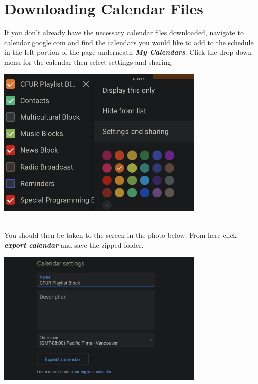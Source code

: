 \section*{Downloading Calendar Files}
If you don't already have the necessary calendar files downloaded, navigate to \url{calendar.google.com} and find the calendars you would like to add to the schedule in the left portion of the page underneath \textbf{\textit{My Calendars}}. Click the drop down menu for the calendar then select settings and sharing.
\\
\begin{center}
   \includegraphics[width=100mm]{images/calendars.png} 
\end{center}
\\
You should then be taken to the screen in the photo below. From here click \textbf{\textit{export calendar}} and save the zipped folder.

\begin{center}
   \includegraphics[width=100mm]{images/export.png} 
\end{center}